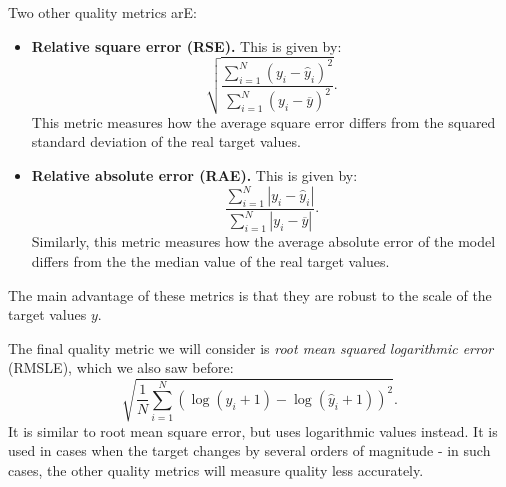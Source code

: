 Two other quality metrics arE:
\begin{itemize}
\item \textbf{Relative square error (RSE).} This is given by:
\begin{equation*}
\sqrt{\frac{\displaystyle \sum_{i=1}^{N} (y_i - \hat{y}_i)^2}{\displaystyle \sum_{i=1}^{N} (y_i - \overline{y})^2}}.
\end{equation*}
This metric measures how the average square error differs from the squared standard deviation of the real target values.
\item \textbf{Relative absolute error (RAE).} This is given by:
\begin{equation*}
\frac{\displaystyle \sum_{i=1}^{N} |y_i - \hat{y}_i|}{\displaystyle \sum_{i=1}^{N} |y_i - \overline{y}|}.
\end{equation*}
Similarly, this metric measures how the average absolute error of the model differs from the the median value of the real target values.
\end{itemize}
The main advantage of these metrics is that they are robust to the scale of the target values $y$.


\newpage
The final quality metric we will consider is \textit{root mean squared logarithmic error} (RMSLE), which we also saw before:
\begin{equation*}
\sqrt{\frac{1}{N} \sum_{i=1}^{N} \left( \log(y_i + 1) - \log(\hat{y}_i + 1) \right)^2}.
\end{equation*}
It is similar to root mean square error, but uses logarithmic values instead. It is used in cases when the target changes by several orders of magnitude - in such cases, the other quality metrics will measure quality less accurately.


